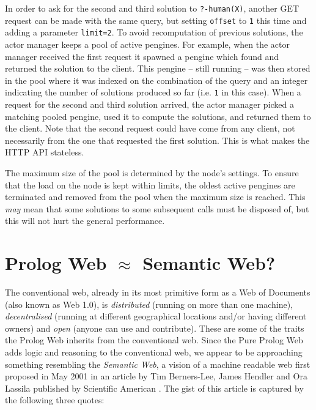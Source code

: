 \documentclass{tlp}
\begin{document}
In order to ask for the second and third solution to \texttt{?-human(X)}, another GET request can be made with the same query, but setting \texttt{offset} to \texttt{1} this time and adding a parameter \texttt{limit=2}. To avoid recomputation of previous solutions, the actor manager keeps a pool of active pengines. For example, when the actor manager received the first request it spawned a pengine which found and returned the solution to the client. This pengine -- still running -- was then stored in the pool where it was indexed on the combination of the query and an integer indicating the number of solutions produced so far (i.e. \texttt{1} in this case). When a request for the second and third solution arrived, the actor manager picked a matching pooled pengine, used it to compute the solutions, and returned them to the client. Note that the second request could have come from any client, not necessarily from the one that requested the first solution. This is what makes the HTTP API stateless.

The maximum size of the pool is determined by the node's settings. To ensure that the load on the node is kept within limits, the oldest active pengines are terminated and removed from the pool when the maximum size is reached. This \textit{may} mean that some solutions to some subsequent calls must be disposed of, but this will not hurt the general performance.



\section{Prolog Web $\approx$ Semantic Web?}\label{sec:wp-ws-sw}

\noindent The conventional web, already in its most primitive form as a Web of Documents (also known as Web 1.0), is \textit{distributed} (running on more than one machine), \textit{decentralised} (running at different geographical locations and/or having different owners) and \textit{open} (anyone can use and contribute). These are some of the traits the Prolog Web inherits from the conventional web. Since the Pure Prolog Web adds logic and reasoning to the conventional web, we appear to be approaching something resembling the \textit{Semantic Web}, a vision of a machine readable web first proposed in May 2001 in an article by Tim Berners-Lee, James Hendler and Ora Lassila published by Scientific American \cite{bernerslee2001semantic}. The gist of this article is captured by the following three quotes:
\end{document}
